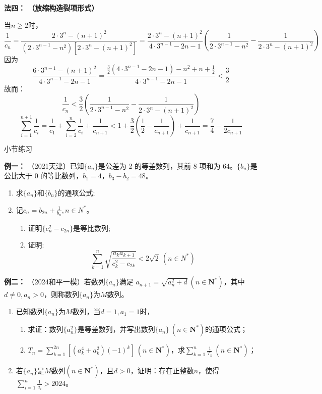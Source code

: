 \documentclass{article}
\begin{document}
\noindent \textbf{法四： （放缩构造裂项形式）}

当$n\ge 2$时，
\[
\frac{1}{c_n}=\frac{2\cdot 3^n-(n+1)^2}{(2\cdot 3^{n-1}-n^2)[2\cdot 3^n-(n+1)^2]}=\frac{2\cdot 3^n-(n+1)^2}{4\cdot 3^{n-1}-2n-1}\left(\frac{1}{2\cdot 3^{n-1}-n^2}-\frac{1}{2\cdot 3^n-(n+1)^2}\right)
\]
因为
\[
\frac{6\cdot 3^{n-1}-(n+1)^2}{4\cdot 3^{n-1}-2n-1}=\frac{\frac{3}{2}(4\cdot 3^{n-1}-2n-1)-n^2+n+\frac{1}{2}}{4\cdot 3^{n-1}-2n-1}<\frac{3}{2}
\]
故而：
\[
\frac{1}{c_n}<\frac{3}{2}\left(\frac{1}{2\cdot 3^{n-1}-n^2}-\frac{1}{2\cdot 3^n-(n+1)^2}\right)
\]
\[
\sum_{i=1}^{n+1}\frac{1}{c_i}=\frac{1}{c_1}+\sum_{i=2}^{n}\frac{1}{c_i}+\frac{1}{c_{n+1}}<1+\frac{3}{2}\left(\frac{1}{2}-\frac{1}{c_{n+1}}\right)+\frac{1}{c_{n+1}}=\frac{7}{4}-\frac{1}{2c_{n+1}}
\]
\newpage

\begin{center}
小节练习
\end{center}

\noindent \textbf{例一： }（2021天津）已知$\{a_n\}$是公差为 2 的等差数列，其前 8 项和为 64。$\{b_n\}$是公比大于 0 的等比数列，$b_1=4$，$b_3-b_2=48$。

\begin{enumerate}[label=(\Roman*)]
    \item 求$\{a_n\}$和$\{b_n\}$的通项公式;
    
    \item 记$c_n = b_{2n} + \frac{1}{b_n}, n \in N^*$。
    \begin{enumerate}[label=(\roman*)]
        \item 证明$\{c_n^2 - c_{2n}\}$是等比数列;
        
        \item 证明:
        $$\sum_{k=1}^{n}\sqrt{\frac{a_k a_{k+1}}{c_k^2 - c_{2k}}} < 2\sqrt{2}\ (n \in N^*)$$
    \end{enumerate}
\end{enumerate}
\vspace{18\baselineskip}

\noindent \textbf{例二： }（2024和平一模）若数列$\{a_n\}$满足 $a_{n+1} = \sqrt{a_n^2 + d}\ (n \in \mathbf{N}^*)$，其中 $d \neq 0, a_n > 0$，则称数列$\{a_n\}$为$M$数列。

\begin{enumerate}[label=(\Roman*)]
    \item 已知数列$\{a_n\}$为$M$数列，当$d=1, a_1=1$时，
    \begin{enumerate}[label=(\roman*)]
        \item 求证：数列$\{a_n^2\}$是等差数列，并写出数列$\{a_n\}\ (n \in \mathbf{N}^*)$的通项公式；
        \item $T_n = \displaystyle\sum\limits_{k=1}^{2n} \left[(a_k^4 + a_k^2)(-1)^k\right]\ (n \in \mathbf{N}^*)$，求$\displaystyle\sum\limits_{k=1}^{n} \frac{1}{T_k}\ (n \in \mathbf{N}^*)$；
    \end{enumerate}
    \item 若$\{a_n\}$是$M$数列$(n \in \mathbf{N}^*)$，且$d>0$，证明：存在正整数$n$，使得$\displaystyle\sum\limits_{i=1}^{n} \frac{1}{a_i} > 2024$。
\end{enumerate}
\newpage
\end{document}
